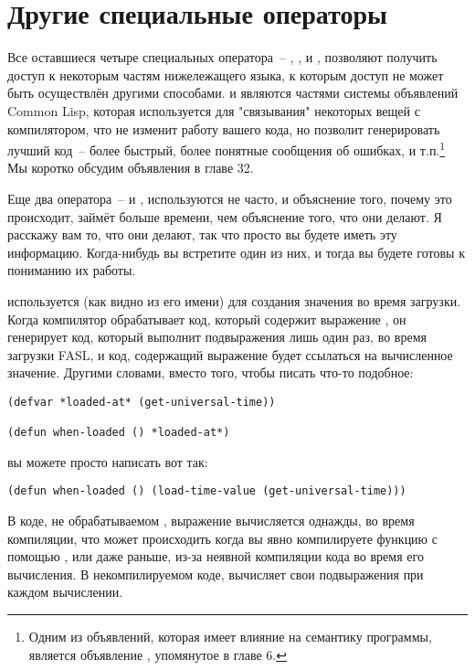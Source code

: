 \section{Другие специальные операторы}

Все оставшиеся четыре специальных оператора~-- , ,
 и , позволяют получить доступ к некоторым частям
нижележащего языка, к которым доступ не может быть осуществлён другими способами.
 и  являются частями системы объявлений Common Lisp, которая
используется для "связывания" некоторых вещей с компилятором, что не изменит работу вашего
кода, но позволит генерировать лучший код~-- более быстрый, более понятные сообщения об
ошибках, и т.п.\footnote{Одним из объявлений, которая имеет влияние на семантику
  программы, является объявление , упомянутое в главе 6.}  Мы коротко
обсудим объявления в главе 32.

Еще два оператора~--  и , используются не часто, и
объяснение того, почему это происходит, займёт больше времени, чем объяснение того, что
они делают. Я расскажу вам то, что они делают, так что просто вы будете иметь эту
информацию. Когда-нибудь вы встретите один из них, и тогда вы будете готовы к пониманию их
работы.

 используется (как видно из его имени) для создания значения во
время загрузки.  Когда компилятор обрабатывает код, который содержит выражение
, он генерирует код, который выполнит подвыражения лишь один раз, во
время загрузки FASL, и код, содержащий выражение  будет ссылаться на
вычисленное значение.  Другими словами, вместо того, чтобы писать что-то подобное:

\begin{lstlisting}
(defvar *loaded-at* (get-universal-time))

(defun when-loaded () *loaded-at*)
\end{lstlisting}

вы можете просто написать вот так:

\begin{lstlisting}
(defun when-loaded () (load-time-value (get-universal-time)))
\end{lstlisting}

В коде, не обрабатываемом , выражение 
вычисляется однажды, во время компиляции, что может происходить когда вы явно компилируете
функцию с помощью , или даже раньше, из-за неявной компиляции кода во время
его вычисления.  В некомпилируемом коде,  вычисляет свои
подвыражения при каждом вычислении.


